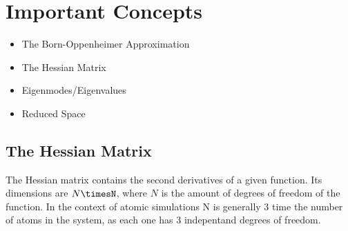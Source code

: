 \section{Important Concepts}
\begin{itemize}
\item The Born-Oppenheimer Approximation
\item The Hessian Matrix
\item Eigenmodes/Eigenvalues
\item Reduced Space
\end{itemize}

\subsection{The Hessian Matrix}
The Hessian matrix contains the second derivatives of a given function.
Its dimensions are $N\timesN$, where $N$ is the amount of degrees of freedom of the function.
In the context of atomic simulations N is generally 3 time the number of atoms in the system, as each one has 3 indepentand degrees of freedom.
